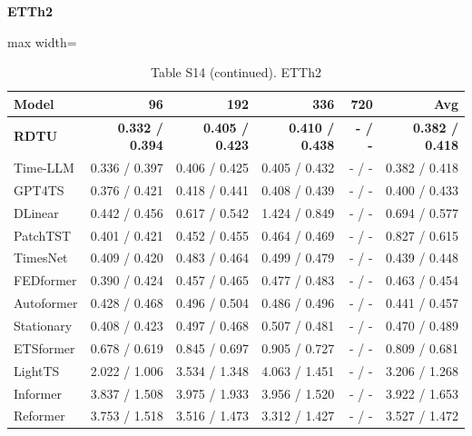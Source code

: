 \begin{table}[H]\centering\small
\caption*{Table S14 (continued). ETTh2}
\textbf{ETTh2}\par\smallskip
\begin{adjustbox}{max width=\linewidth}\begin{tabular}{lrrrrr}\toprule
\textbf{Model} & \textbf{96} & \textbf{192} & \textbf{336} & \textbf{720} & \textbf{Avg}\\\midrule
\rowcolor{blue!5}
\textbf{RDTU} & \textbf{0.332 / 0.394} & \textbf{0.405 / 0.423} & \textbf{0.410 / 0.438} & \textbf{- / -} & \textbf{0.382 / 0.418}\\
Time-LLM & 0.336 / 0.397 & 0.406 / 0.425 & 0.405 / 0.432 & - / - & 0.382 / 0.418\\
GPT4TS & 0.376 / 0.421 & 0.418 / 0.441 & 0.408 / 0.439 & - / - & 0.400 / 0.433\\
DLinear & 0.442 / 0.456 & 0.617 / 0.542 & 1.424 / 0.849 & - / - & 0.694 / 0.577\\
PatchTST & 0.401 / 0.421 & 0.452 / 0.455 & 0.464 / 0.469 & - / - & 0.827 / 0.615\\
TimesNet & 0.409 / 0.420 & 0.483 / 0.464 & 0.499 / 0.479 & - / - & 0.439 / 0.448\\
FEDformer & 0.390 / 0.424 & 0.457 / 0.465 & 0.477 / 0.483 & - / - & 0.463 / 0.454\\
Autoformer & 0.428 / 0.468 & 0.496 / 0.504 & 0.486 / 0.496 & - / - & 0.441 / 0.457\\
Stationary & 0.408 / 0.423 & 0.497 / 0.468 & 0.507 / 0.481 & - / - & 0.470 / 0.489\\
ETSformer & 0.678 / 0.619 & 0.845 / 0.697 & 0.905 / 0.727 & - / - & 0.809 / 0.681\\
LightTS & 2.022 / 1.006 & 3.534 / 1.348 & 4.063 / 1.451 & - / - & 3.206 / 1.268\\
Informer & 3.837 / 1.508 & 3.975 / 1.933 & 3.956 / 1.520 & - / - & 3.922 / 1.653\\
Reformer & 3.753 / 1.518 & 3.516 / 1.473 & 3.312 / 1.427 & - / - & 3.527 / 1.472\\
\bottomrule\end{tabular}\end{adjustbox}\end{table}
